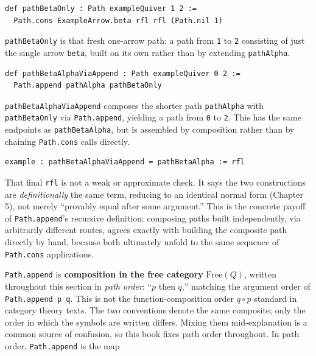 \begin{lstlisting}
def pathBetaOnly : Path exampleQuiver 1 2 :=
  Path.cons ExampleArrow.beta rfl rfl (Path.nil 1)
\end{lstlisting}

\texttt{pathBetaOnly} is that fresh one-arrow path: a path from \texttt{1} to \texttt{2} consisting of just the single arrow \texttt{beta}, built on its own rather than by extending \texttt{pathAlpha}.

\begin{lstlisting}
def pathBetaAlphaViaAppend : Path exampleQuiver 0 2 :=
  Path.append pathAlpha pathBetaOnly
\end{lstlisting}

\texttt{pathBetaAlphaViaAppend} composes the shorter path \texttt{pathAlpha} with \texttt{pathBetaOnly} via \texttt{Path.append}, yielding a path from \texttt{0} to \texttt{2}. This has the same endpoints as \texttt{pathBetaAlpha}, but is assembled by composition rather than by chaining \texttt{Path.cons} calls directly.

\begin{lstlisting}
example : pathBetaAlphaViaAppend = pathBetaAlpha := rfl
\end{lstlisting}

That final \texttt{rfl} is not a weak or approximate check. It says the two constructions are \emph{definitionally} the same term, reducing to an identical normal form (Chapter 5), not merely ``provably equal after some argument.'' This is the concrete payoff of \texttt{Path.append}'s recursive definition: composing paths built independently, via arbitrarily different routes, agrees exactly with building the composite path directly by hand, because both ultimately unfold to the same sequence of \texttt{Path.cons} applications.

\begin{mathreading}

\texttt{Path.append} is \textbf{composition in the free category} \(\mathrm{Free}(Q)\), written throughout this section in \emph{path order}: ``\(p\) then \(q\),'' matching the argument order of \texttt{Path.append p q}. This is not the function-composition order \(q \circ p\) standard in category theory texts. The two conventions denote the same composite; only the order in which the symbols are written differs. Mixing them mid-explanation is a common source of confusion, so this book fixes path order throughout. In path order, \texttt{Path.append} is the map

\end{mathreading}

